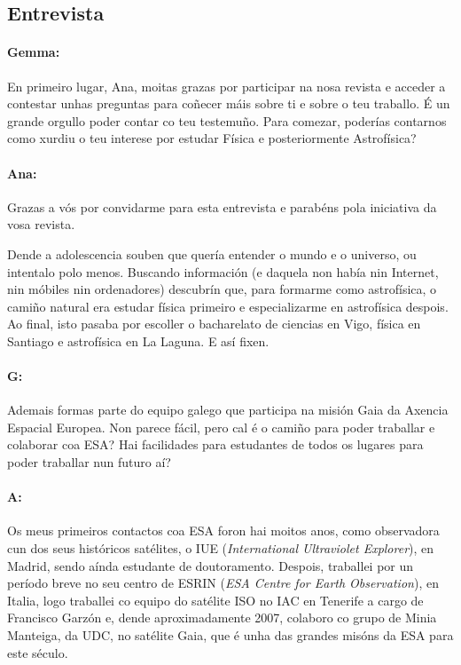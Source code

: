 \begin{refsection}
\begin{multicols}{2}
\subsection*{Entrevista}%

\paragraph{Gemma:} En primeiro lugar, Ana, moitas grazas por participar na nosa
revista e acceder a contestar unhas preguntas para coñecer máis sobre ti e
sobre o teu traballo. É un grande orgullo poder contar co teu testemuño. Para
comezar, poderías contarnos como xurdiu o teu interese por estudar Física e
posteriormente Astrofísica?

\paragraph{Ana:} Grazas a vós por convidarme para esta entrevista e parabéns pola
iniciativa da vosa revista.

Dende a adolescencia souben que quería entender o mundo e o universo, ou
intentalo polo menos. Buscando información (e daquela non había nin Internet,
nin móbiles nin ordenadores) descubrín que, para formarme como astrofísica, o
camiño natural era estudar física primeiro e especializarme en astrofísica
despois. Ao final, isto pasaba por escoller o bacharelato de ciencias en Vigo,
física en Santiago e astrofísica en La Laguna. E así fixen.

\paragraph{G:} Ademais formas parte do equipo galego que participa na misión Gaia
da Axencia Espacial Europea. Non parece fácil, pero cal é o camiño para poder
traballar e colaborar coa ESA? Hai facilidades para estudantes de todos os
lugares para poder traballar nun futuro aí?

\paragraph{A:} Os meus primeiros contactos coa ESA foron hai moitos anos, como
observadora cun dos seus históricos satélites, o IUE (\textit{International
Ultraviolet Explorer}), en Madrid, sendo aínda estudante de doutoramento.
Despois, traballei por un período breve no seu centro de ESRIN (\textit{ESA
Centre for Earth Observation}), en Italia, logo traballei co equipo do satélite
ISO no IAC en Tenerife a cargo de Francisco Garzón e, dende aproximadamente
2007, colaboro co grupo de Minia Manteiga, da UDC, no satélite Gaia, que é unha
das grandes misóns da ESA para este século.


\end{multicols}
\end{refsection}
